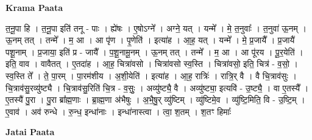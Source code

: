 \documentclass[17pt]{extarticle}
\begin{document}
\textbf{Krama Paata} \newline

त॒नू॒पा हि । त॒नू॒पा इति॑ तनू - पाः । ह्ये॑षः । ए॒षोऽग्ने᳚ । अग्ने॒ यत् । यन्मे᳚ । मे॒ त॒नुवाः᳚ । त॒नुवा॑ ऊ॒नम् । ऊ॒नम् तत् । तन्मे᳚ । म॒ आ । आ पृ॑ण । पृ॒णेति॑ । इत्या॑ह । आ॒ह॒ यत् । यन्मे᳚ । मे॒ प्र॒जायै᳚ । प्र॒जायै॑ पशू॒नाम् । प्र॒जाया॒ इति॑ प्र - जायै᳚ । प॒शू॒नामू॒नम् । ऊ॒नम् तत् । तन्मे᳚ । म॒ आ । आ पू॑रय । पू॒र॒येति॑ । इति॒ वाव । वावैतत् । ए॒तदा॑ह । आ॒ह॒ चित्रा॑वसो । चित्रा॑वसो स्व॒स्ति । चित्रा॑वसो॒ इति॒ चित्र॑ - व॒सो॒ । स्व॒स्ति ते᳚ । ते॒ पा॒रम् । पा॒रम॑शीय । अ॒शी॒येति॑ । इत्या॑ह । आ॒ह॒ रात्रिः॑ । रात्रि॒र् वै । वै चि॒त्राव॑सुः । चि॒त्राव॑सु॒रव्यु॑ष्ट्यै । चि॒त्राव॑सु॒रिति॑ चि॒त्र - व॒सुः॒ । अव्यु॑ष्ट्यै॒ वै । अव्यु॑ष्ट्या॒ इत्यवि॑ - उ॒ष्ट्यै॒ । वा ए॒तस्यै᳚ । ए॒तस्यै॑ पु॒रा । पु॒रा ब्रा᳚ह्म॒णाः । ब्रा॒ह्म॒णा अ॑भैषुः । अ॒भै॒षु॒र् व्यु॑ष्टिम् । व्यु॑ष्टिमे॒व । व्यु॑ष्टि॒मिति॒ वि - उ॒ष्टि॒म् । ए॒वाव॑ । अव॑ रुन्धे । रु॒न्ध॒ इन्धा॑नाः । इन्धा॑नास्त्वा । त्वा॒ श॒तम् । श॒तꣳ हिमाः᳚ \newline

\textbf{Jatai Paata} \newline
\end{document}
